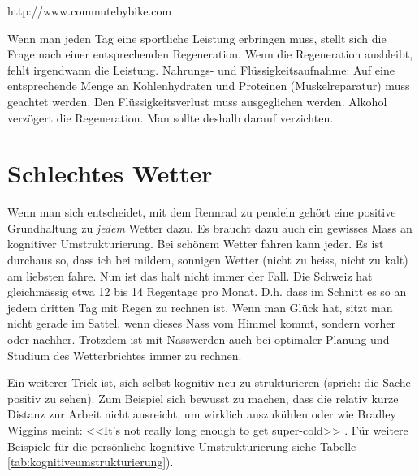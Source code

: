 \documentclass[a4paper,DIV13,BCOR1cm]{scrbook}
\begin{document}
http://www.commutebybike.com

Wenn man jeden Tag eine sportliche Leistung erbringen muss, stellt sich die Frage nach einer entsprechenden Regeneration. Wenn die Regeneration ausbleibt, fehlt irgendwann die Leistung.
Nahrungs- und Flüssigkeitsaufnahme: Auf eine entsprechende Menge an Kohlenhydraten und Proteinen (Muskelreparatur) muss geachtet werden. Den Flüssigkeitsverlust muss ausgeglichen werden.
Alkohol verzögert die Regeneration. Man sollte deshalb darauf verzichten.



\chapter{Schlechtes Wetter}



Wenn man sich entscheidet, mit dem Rennrad zu pendeln gehört eine positive Grundhaltung zu \emph{jedem} Wetter dazu.
Es braucht dazu auch ein gewisses Mass an kognitiver Umstrukturierung. Bei schönem Wetter fahren kann jeder.
Es ist durchaus so, dass ich bei mildem, sonnigen Wetter (nicht zu heiss, nicht zu kalt) am liebsten fahre.
Nun ist das halt nicht immer der Fall. Die Schweiz hat gleichmässig etwa 12 bis 14 Regentage pro Monat.
D.h. dass im Schnitt es so an jedem dritten Tag mit Regen zu rechnen ist.
Wenn man Glück hat, sitzt man nicht gerade im Sattel, wenn dieses Nass vom Himmel kommt, sondern vorher oder nachher.
Trotzdem ist mit Nasswerden auch bei optimaler Planung und Studium des Wetterbrichtes immer zu rechnen.

Ein weiterer Trick ist, sich selbst kognitiv neu zu strukturieren (sprich: die Sache positiv zu sehen).
Zum Beispiel sich bewusst zu machen, dass die relativ kurze Distanz zur Arbeit nicht ausreicht, 
um wirklich auszukühlen oder wie Bradley Wiggins meint: <<It's not really long enough to get super-cold>> \cite{bbc2015wigginswinter}.
Für weitere Beispiele für die persönliche kognitive Umstrukturierung siehe Tabelle \ref{tab:kognitiveumstrukturierung}).
\end{document}
